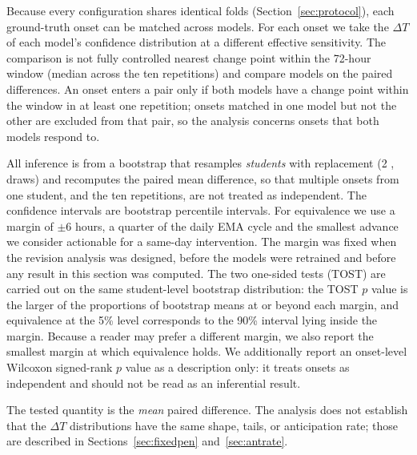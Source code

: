 \documentclass[preprint,12pt,authoryear]{elsarticle}
\newcommand{\dt}{$\Delta T$}
\providecommand{\DIFaddtex}[1]{{\protect\color{blue} \sf #1}} %
\providecommand{\DIFdeltex}[1]{{\protect\color{red} \scriptsize #1}} %
\providecommand{\DIFaddbegin}{} %
\providecommand{\DIFaddend}{} %
\providecommand{\DIFdelbegin}{} %
\providecommand{\DIFdelend}{} %
\providecommand{\DIFadd}[1]{\texorpdfstring{\DIFaddtex{#1}}{#1}} %
\providecommand{\DIFdel}[1]{\texorpdfstring{\DIFdeltex{#1}}{}} %
\newcommand{\DIFscaledelfig}{0.5}
\newlength{\DIFdelgraphicswidth} %
\newlength{\DIFdelgraphicsheight} %
\newcommand{\DIFaddincludegraphics}[2][]{{\color{blue}\fbox{\DIFOincludegraphics[#1]{#2}}}} %
\newcommand{\DIFdelincludegraphics}[2][]{%
\sbox{\DIFdelgraphicsbox}{\DIFOincludegraphics[#1]{#2}}%
\settoboxwidth{\DIFdelgraphicswidth}{\DIFdelgraphicsbox} %
\settoboxtotalheight{\DIFdelgraphicsheight}{\DIFdelgraphicsbox} %
\scalebox{\DIFscaledelfig}{%
\parbox[b]{\DIFdelgraphicswidth}{\usebox{\DIFdelgraphicsbox}\\[-\baselineskip] \rule{\DIFdelgraphicswidth}{0em}}\llap{\resizebox{\DIFdelgraphicswidth}{\DIFdelgraphicsheight}{%
\setlength{\unitlength}{\DIFdelgraphicswidth}%
\begin{picture}(1,1)%
\thicklines\linethickness{2pt} %
{\color[rgb]{1,0,0}\put(0,0){\framebox(1,1){}}}%
{\color[rgb]{1,0,0}\put(0,0){\line( 1,1){1}}}%
{\color[rgb]{1,0,0}\put(0,1){\line(1,-1){1}}}%
\end{picture}%
}\hspace*{3pt}}} %
} %
\DeclareRobustCommand{\DIFaddbegin}{\DIFOaddbegin \let\includegraphics\DIFaddincludegraphics} %
\DeclareRobustCommand{\DIFaddend}{\DIFOaddend \let\includegraphics\DIFOincludegraphics} %
\DeclareRobustCommand{\DIFdelbegin}{\DIFOdelbegin \let\includegraphics\DIFdelincludegraphics} %
\DeclareRobustCommand{\DIFdelend}{\DIFOaddend \let\includegraphics\DIFOincludegraphics} %
\begin{document}
\DIFadd{Because every configuration shares identical folds
(Section~\ref{sec:protocol}), each ground-truth onset can be matched across models.
For each onset we take the \dt{} of }\DIFaddend each model's \DIFdelbegin \DIFdel{confidence distribution at a different effective
sensitivity. The comparison is not fully controlled}\DIFdelend \DIFaddbegin \DIFadd{nearest change point
within the 72-hour window (median across the ten repetitions) and
compare models on the paired differences. An onset enters a pair only
if both models have a change point within the window in at least one
repetition; onsets matched in one model but not the other are excluded
from that pair, so the analysis concerns onsets that both models
respond to.
}

\DIFadd{All inference is from a bootstrap that resamples \emph{students} with
replacement (2}{\DIFadd{,}}\DIFadd{000 draws) and recomputes the paired mean difference,
so that multiple onsets from one student, and the ten repetitions,
are not treated as independent. The confidence intervals are bootstrap
percentile intervals. For equivalence we use a margin of $\pm 6$ hours,
a quarter of the daily EMA cycle and the smallest advance we consider
actionable for a same-day intervention. The margin was fixed when the
revision analysis was designed, before the models were retrained and
before any result in this section was computed. The two one-sided
tests (TOST) are carried out on the same student-level bootstrap
distribution: the TOST $p$ value is the larger of the proportions of
bootstrap means at or beyond each margin, and equivalence at the 5\%
level corresponds to the 90\% interval lying inside the margin. Because
a reader may prefer a different margin, we also report the smallest
margin at which equivalence holds. We additionally report an
onset-level Wilcoxon signed-rank $p$ value as a description only: it
treats onsets as independent and should not be read as an inferential
result.
}

\DIFadd{The tested quantity is the \emph{mean} paired difference. The analysis
does not establish that the \dt{} distributions have the same shape,
tails, or anticipation rate; those are described in
Sections~\ref{sec:fixedpen} and~\ref{sec:antrate}.
}
\end{document}
